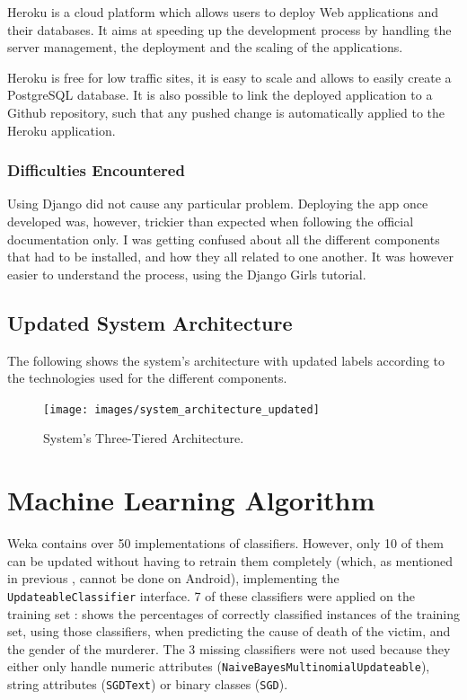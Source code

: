 \documentclass{mproj}
\begin{document}
Heroku is a cloud platform which allows users to deploy Web applications and their databases. It aims at speeding up the development process by handling the server management, the deployment and the scaling of the applications. \cite{heroku}

Heroku is free for low traffic sites, it is easy to scale and allows to easily create a PostgreSQL database. It is also possible to link the deployed application to a Github repository, such that any pushed change is automatically applied to the Heroku application. \cite[Chapter~1]{herokubook}

\subsubsection*{Difficulties Encountered}

Using Django did not cause any particular problem. Deploying the app once developed was, however, trickier than expected when following the official documentation only. I was getting confused about all the different components that had to be installed, and how they all related to one another. It was however easier to understand the process, using the Django Girls tutorial. \cite{djangogirls}

\subsection*{Updated System Architecture}

The following  shows the system's architecture with updated labels according to the technologies used for the different components.

\begin{figure}[h]
	\centering
	\texttt{[image: images/system\_architecture\_updated]}
	\caption{System's Three-Tiered Architecture.}
	\label{fig:architecture_updated}
\end{figure}

\section{Machine Learning Algorithm}

Weka contains over 50 implementations of classifiers. \cite[Table~11.5]{wekabook} However, only 10 of them can be updated without having to retrain them completely (which, as mentioned in previous , cannot be done on Android), implementing the \verb|UpdateableClassifier| interface. \cite{wekaupdateable} 7 of these classifiers were applied on the training set :  shows the percentages of correctly classified instances of the training set, using those classifiers, when predicting the cause of death of the victim, and the gender of the murderer. The 3 missing classifiers were not used because they either only handle numeric attributes (\verb|NaiveBayesMultinomialUpdateable|), string attributes (\verb|SGDText|) or binary classes (\verb|SGD|).
\end{document}
